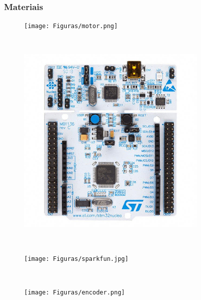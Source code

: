 \begin{frame}
\vspace{-0.4cm}
\begin{figure}[noframenumbering]
	\frametitle{Materiais}
     \centering
     \captionsetup{width=\textwidth,font=footnotesize,textfont=bf}
     \begin{subfigure}[b]{0.2\textwidth}
 	\centering
         \texttt{[image: Figuras/motor.png]}
         \caption{\centering \label{fig:a1}}
     \end{subfigure}
     ~
     \begin{subfigure}[b]{0.2\textwidth}
 	\centering
         \includegraphics[width=\textwidth,height=0.3\textheight,keepaspectratio]{Figuras/nucleo.jpg}
         \caption{\centering \label{fig:a2}}
     \end{subfigure}
     ~
     \begin{subfigure}[b]{0.2\textwidth}
 	\centering
         \texttt{[image: Figuras/sparkfun.jpg]}
         \caption{\centering \label{fig:a3}}
     \end{subfigure}
          ~
     \begin{subfigure}[b]{0.2\textwidth}
 	\centering
         \texttt{[image: Figuras/encoder.png]}
         \caption{\centering \label{fig:a4}}
     \end{subfigure}
     

\end{figure}
\end{frame}
